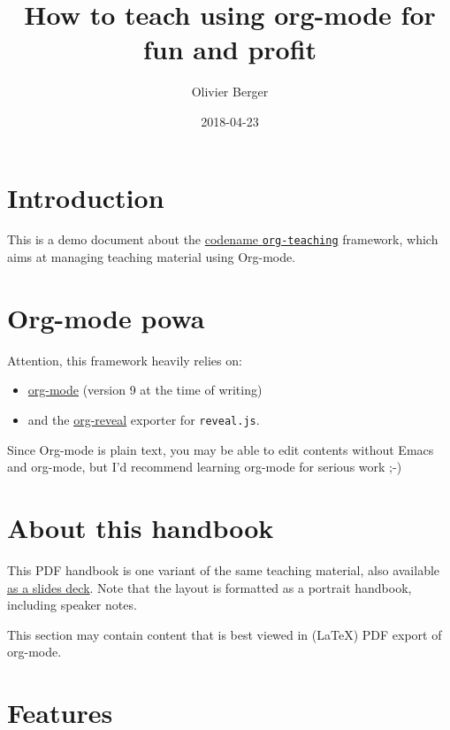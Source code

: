 \documentclass[a4paper]{article}
\author{Olivier Berger}
\date{2018-04-23}
\title{How to teach using org-mode for fun and profit}
\begin{document}
\setcounter{tocdepth}{1}
\tableofcontents




\section{Introduction}
\label{sec:orge97d4b9}

This is a demo document about the
\href{http://www-public.tem-tsp.eu/\~berger\_o/org-teaching/}{codename
\texttt{org-teaching}} framework, which aims at managing teaching material
using Org-mode.

\section{Org-mode powa}
\label{sec:org2d80dd3}

Attention, this framework heavily relies on: 

\begin{itemize}
\item \href{http://orgmode.org/}{org-mode} (version 9 at the time of writing)
\item and the \href{https://github.com/yjwen/org-reveal/}{org-reveal} exporter for \texttt{reveal.js}.
\end{itemize}

\begin{NOTES}
Since Org-mode is plain text, you may be able to edit contents without
Emacs and org-mode, but I'd recommend learning org-mode for serious
work ;-)
\end{NOTES}

\section{About this handbook}
\label{sec:orgc951438}

This PDF handbook is one variant of the same teaching material, also
available \href{./slides.html}{as a slides deck}. Note that the layout is
formatted as a portrait handbook, including speaker notes.

This section may contain content that is best viewed in (\LaTeX{}) PDF export of org-mode.

\section{Features}
\label{sec:org88ccf34}
\end{document}
